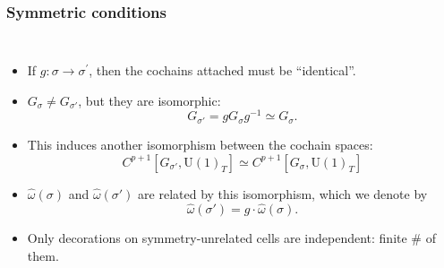\documentclass[xcolor=table, 10pt, aspectratio=43]{beamer}
\newcommand{\uone}{\mathrm U(1)}
\begin{document}
\begin{frame}
	\frametitle{Symmetric conditions}
	\begin{columns}
		\begin{itemize}
			\item If $g:\sigma\rightarrow\sigma^\prime$, then the cochains attached must be ``identical''.
			\item $G_\sigma\neq G_{\sigma'}$, but they are isomorphic:
			\[G_{\sigma'}=gG_\sigma g^{-1}\simeq G_\sigma.\]
			\item This induces another isomorphism between the cochain spaces:
			\[C^{p+1}[G_{\sigma'},\uone_T]\simeq C^{p+1}[G_\sigma,\uone_T]\]
			\item $\hat\omega(\sigma)$ and $\hat\omega(\sigma')$ are related by this isomorphism, which we denote by
			\[\hat\omega(\sigma') = g\cdot \hat\omega(\sigma).\]
			\item Only decorations on symmetry-unrelated cells are independent: finite \# of them.
		\end{itemize}
	\end{columns}
\end{frame}
\end{document}
